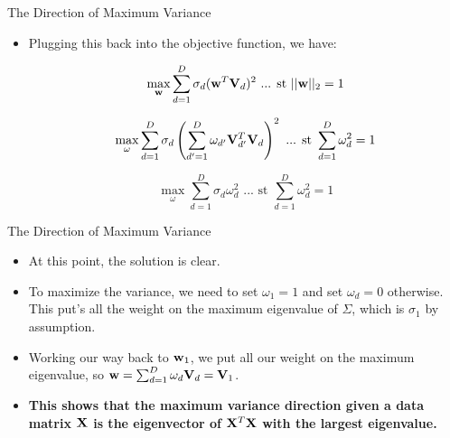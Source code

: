 \documentclass[serif,xcolor=pdftex,dvipsnames,table,hyperref={bookmarks=false,breaklinks}]{beamer}
\begin{document}
\begin{frame}[t]{The Direction of Maximum Variance}

\begin{itemize}

\item Plugging this back into the objective function, we have:

$$\max_{{\mathbf{w}}} \sum_{d=1}^D \sigma_d 
({\mathbf{w}}^T{\mathbf{V}}_d)^2 \mbox{ ... st } 
||{\mathbf{w}}||_2=1 $$

\pause
$$\max_{\omega} \sum_{d=1}^D \sigma_d 
\left(\sum_{d'=1}^D\omega_{d'}{\mathbf{V}}_{d'}^T{\mathbf{V}}_d\right)^2 \mbox{ ... st } 
\sum_{d=1}^D \omega_d^2=1 $$

\pause
$$\max_{\omega} \sum_{d=1}^D \sigma_d \omega_d^2 \mbox{ ... st } 
\sum_{d=1}^D \omega_d^2=1 $$


\end{itemize} 
\end{frame}

\begin{frame}[t]{The Direction of Maximum Variance}

\begin{itemize}

\item At this point, the solution is clear.

\pause\item To maximize the variance, we need to set $\omega_1=1$ 
and set $\omega_d=0$ otherwise. \pause This put's all the weight on the maximum 
eigenvalue of $\Sigma$, which is $\sigma_1$ by assumption.

\pause\item Working our way back to ${\mathbf{w}}_1$, we put all our weight on the 
maximum eigenvalue, so ${\mathbf{w}} = 
\sum_{d=1}^D\omega_d{\mathbf{V}}_d = {\mathbf{V}}_1$.

\pause\item \textbf{This shows that the maximum variance direction given a data 
matrix ${\mathbf{X}}$ is the eigenvector of ${\mathbf{X}}^T{\mathbf{X}}$ with the 
largest eigenvalue. }


\end{itemize} 
\end{frame}
\end{document}
